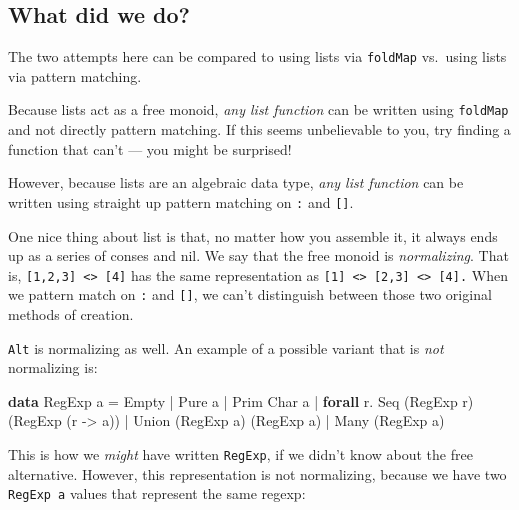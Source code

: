 \documentclass[]{article}
\newenvironment{Shaded}{}{}
\newcommand{\DataTypeTok}[1]{\textcolor[rgb]{0.56,0.13,0.00}{#1}}
\newcommand{\FunctionTok}[1]{\textcolor[rgb]{0.02,0.16,0.49}{#1}}
\newcommand{\KeywordTok}[1]{\textcolor[rgb]{0.00,0.44,0.13}{\textbf{#1}}}
\newcommand{\NormalTok}[1]{#1}
\newcommand{\OtherTok}[1]{\textcolor[rgb]{0.00,0.44,0.13}{#1}}
\begin{document}
\hypertarget{what-did-we-do}{%
\subsection{What did we do?}\label{what-did-we-do}}

The two attempts here can be compared to using lists via \texttt{foldMap}
vs.~using lists via pattern matching.

Because lists act as a free monoid, \emph{any list function} can be written
using \texttt{foldMap} and not directly pattern matching. If this seems
unbelievable to you, try finding a function that can't --- you might be
surprised!

However, because lists are an algebraic data type, \emph{any list function} can
be written using straight up pattern matching on \texttt{:} and \texttt{{[}{]}}.

One nice thing about list is that, no matter how you assemble it, it always ends
up as a series of conses and nil. We say that the free monoid is
\emph{normalizing}. That is,
\texttt{{[}1,2,3{]}\ \textless{}\textgreater{}\ {[}4{]}} has the same
representation as
\texttt{{[}1{]}\ \textless{}\textgreater{}\ {[}2,3{]}\ \textless{}\textgreater{}\ {[}4{]}.}
When we pattern match on \texttt{:} and \texttt{{[}{]}}, we can't distinguish
between those two original methods of creation.

\texttt{Alt} is normalizing as well. An example of a possible variant that is
\emph{not} normalizing is:

\begin{Shaded}
\begin{Highlighting}[]
\KeywordTok{data} \DataTypeTok{RegExp}\NormalTok{ a }\FunctionTok{=} \DataTypeTok{Empty}
              \FunctionTok{|} \DataTypeTok{Pure}\NormalTok{ a}
              \FunctionTok{|} \DataTypeTok{Prim} \DataTypeTok{Char}\NormalTok{ a}
              \FunctionTok{|} \KeywordTok{forall}\NormalTok{ r}\FunctionTok{.} \DataTypeTok{Seq}\NormalTok{ (}\DataTypeTok{RegExp}\NormalTok{ r) (}\DataTypeTok{RegExp}\NormalTok{ (r }\OtherTok{->}\NormalTok{ a))}
              \FunctionTok{|} \DataTypeTok{Union}\NormalTok{ (}\DataTypeTok{RegExp}\NormalTok{ a) (}\DataTypeTok{RegExp}\NormalTok{ a)}
              \FunctionTok{|} \DataTypeTok{Many}\NormalTok{ (}\DataTypeTok{RegExp}\NormalTok{ a)}
\end{Highlighting}
\end{Shaded}

This is how we \emph{might} have written \texttt{RegExp}, if we didn't know
about the free alternative. However, this representation is not normalizing,
because we have two \texttt{RegExp\ a} values that represent the same regexp:
\end{document}
